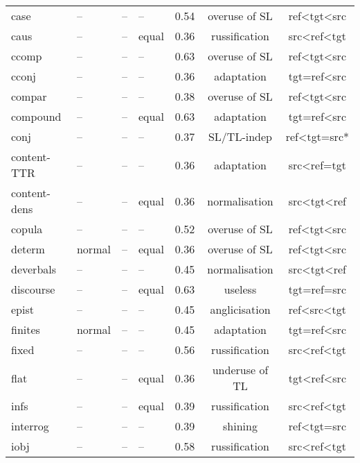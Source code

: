 \begin{longtable}{l|p{2cm}p{2cm}p{1.5cm}ccc}
	case          & -- & -- & -- & 0.54    & overuse of SL  & ref\textless{}tgt\textless{}src \\
	caus          & -- & -- & equal & 0.36    & russification  & src\textless{}ref\textless{}tgt \\
	ccomp         & -- & -- & -- & 0.63    & overuse of SL  & ref\textless{}tgt\textless{}src \\
	cconj         & -- & -- & -- & 0.36    & adaptation     & tgt=ref\textless{}src           \\
	compar        & -- & -- & -- & 0.38    & overuse of SL  & ref\textless{}tgt\textless{}src \\
	compound      & -- & -- & equal & 0.63    & adaptation     & tgt=ref\textless{}src           \\
	conj          & -- & --& -- & 0.37    & SL/TL-indep    & ref\textless{}tgt=src*          \\
	content-TTR  & -- & -- & -- & 0.36    & adaptation     & src\textless{}ref=tgt        \\
	content-dens & -- & -- & equal& 0.36    & normalisation  & src\textless{}tgt\textless{}ref \\
	copula        & -- & -- & --& 0.52 & overuse of SL  & ref\textless{}tgt\textless{}src \\
	determ        & normal       & -- & equal & 0.36    & overuse of SL  & ref\textless{}tgt\textless{}src \\
	deverbals     & -- & -- & -- & 0.45 & normalisation  & src\textless{}tgt\textless{}ref \\
	discourse     & -- & -- & equal & 0.63    & useless  & tgt=ref=src                     \\
	epist         & -- & -- & -- & 0.45 & anglicisation  & ref\textless{}src\textless{}tgt \\
	finites       & normal       & -- & -- & 0.45 & adaptation     & tgt=ref\textless{}src           \\
	fixed         & -- & -- & --       & 0.56    & russification  & src\textless{}ref\textless{}tgt \\
	flat          & -- & -- & equal    & 0.36    & underuse of TL  & tgt\textless{}ref\textless{}src \\
	infs          & -- & -- & equal    & 0.39    & russification  & src\textless{}ref\textless{}tgt \\
	interrog      & -- & -- & --       & 0.39    & shining        & ref\textless{}tgt=src           \\
	iobj          & -- & -- & --       & 0.58    & russification  & src\textless{}ref\textless{}tgt \\

\end{longtable}

